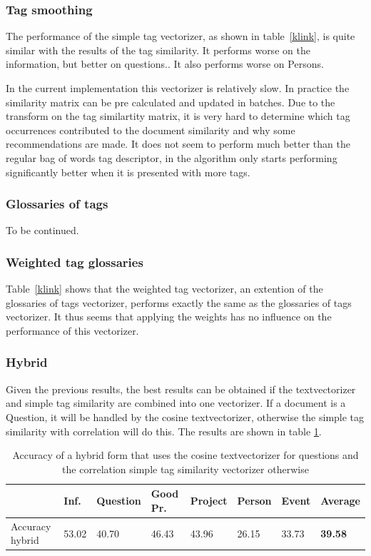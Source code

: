 \subsubsection{Tag smoothing}
The performance of the simple tag vectorizer, as shown in table~\ref{klink}, is
quite similar with the results of the tag similarity. It performs worse on the
information, but better on questions.. It also
performs worse on Persons. 

In the current implementation this vectorizer is relatively slow. In practice
the similarity matrix can be pre calculated and updated in batches. Due to the
transform on the tag similartity matrix, it is very hard to determine which tag
occurrences contributed to the document similarity and why some recommendations
are made. It does not seem to perform much better than the regular bag of words
tag descriptor, in \citeauthor{zhou2011web} the algorithm only starts
performing significantly better when it is presented with more tags.

\subsubsection{Glossaries of tags}
To be continued.

\subsubsection{Weighted tag glossaries}
Table~\ref{klink} shows that the weighted tag vectorizer, an extention of the glossaries of tags vectorizer, performs exactly the same as the glossaries of tags vectorizer. It thus seems that applying the weights has no influence on the performance of this vectorizer. 

\subsubsection{Hybrid}
Given the previous results, the best results can be obtained if the textvectorizer and simple tag similarity are combined into one vectorizer. If a document is a Question, it will be handled by the cosine textvectorizer, otherwise the simple tag similarity with correlation will do this. The results are shown in table \ref{hybrid}. 

\begin{table}[h!]
\begin{tabular}{| l | l | l | l | l | l | l | l |}
\hline
 & Inf. &  Question &  Good Pr.& Project & Person &  Event & {\bf Average} \\
\hline
Accuracy hybrid & 53.02 & 40.70 & 46.43 & 43.96 & 26.15 & 33.73 & {\bf 39.58}\\
\hline
\end{tabular}
\caption{Accuracy of a hybrid form that uses the cosine textvectorizer for questions and the correlation simple tag similarity vectorizer otherwise}
\label{hybrid}
\end{table}

